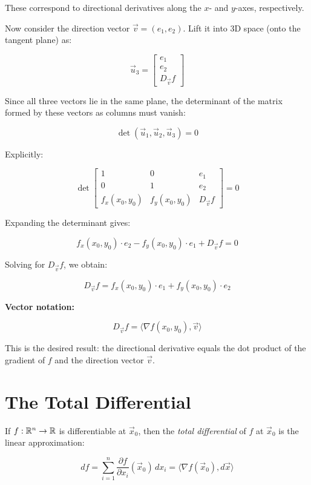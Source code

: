 These correspond to directional derivatives along the \(x\)- and \(y\)-axes, respectively.

Now consider the direction vector \( \vec{v} = (e_1, e_2) \). Lift it into 3D space (onto the tangent 
plane) as:

\[
    \vec{u}_3 =
    \begin{bmatrix}
    e_1 \\
    e_2 \\
    D_{\vec{v}}f
    \end{bmatrix}
\]

Since all three vectors lie in the same plane, the determinant of the matrix formed by these vectors as 
columns must vanish:

\[
    \det(\vec{u}_1, \vec{u}_2, \vec{u}_3) = 0
\]

Explicitly:

\[
    \det
    \begin{bmatrix}
    1 & 0 & e_1 \\
    0 & 1 & e_2 \\
    f_x(x_0, y_0) & f_y(x_0, y_0) & D_{\vec{v}}f
    \end{bmatrix} = 0
\]

Expanding the determinant gives:

\[
    f_x(x_0, y_0) \cdot e_2 - f_y(x_0, y_0) \cdot e_1 + D_{\vec{v}}f = 0
\]

Solving for \( D_{\vec{v}}f \), we obtain:

\[
    D_{\vec{v}}f = f_x(x_0, y_0) \cdot e_1 + f_y(x_0, y_0) \cdot e_2
\]

\textbf{Vector notation:}

\[
    D_{\vec{v}}f = \langle \nabla f(x_0, y_0), \vec{v} \rangle
\]

This is the desired result: the directional derivative equals the dot product of the gradient of \(f\) 
and the direction vector \( \vec{v} \).

\section{The Total Differential}

If \( f : \mathbb{R}^n \to \mathbb{R} \) is differentiable at \( \vec{x}_0 \), then the 
\emph{total differential} of \(f\) at \( \vec{x}_0 \) is the linear approximation:

\[
    df = \sum_{i=1}^n \frac{\partial f}{\partial x_i}(\vec{x}_0) \, dx_i = \langle \nabla f(\vec{x}_0), 
    d\vec{x} \rangle
\]

